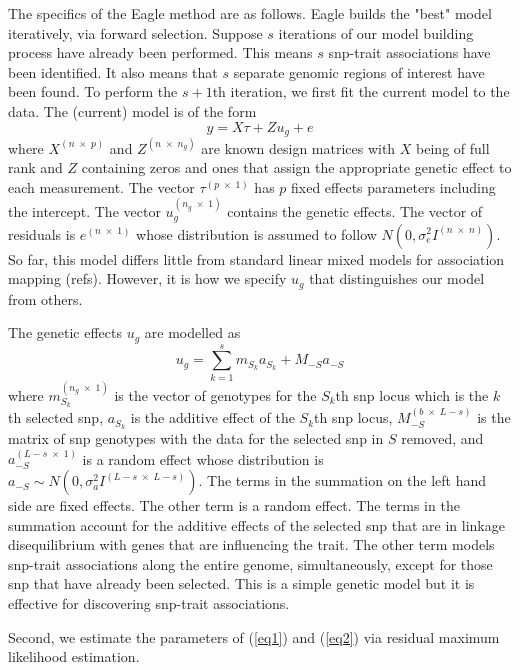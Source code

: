 \documentclass{nature}
\begin{document}
The specifics of the Eagle method are as follows. 
Eagle builds the "best" model iteratively, via forward selection. 
Suppose $s$ iterations of our model building process have already been performed. This means $s$ snp-trait 
associations have been identified.  It also means that $s$ separate genomic regions of interest have been found.  
To perform the $s+1$th  iteration, we first fit the current model to the data. 
The (current) model is of the form 
\begin{equation}
\label{eq1}
y = X \tau + Z u_g + e
\end{equation}
where 
$X^{(n \; \times \; p)}$ and $Z^{( n \; \times \; n_g)}$ are known design matrices with $X$ being of full rank and $Z$ 
containing zeros and ones that assign the appropriate genetic effect to each measurement. 
The vector 
$\tau^{(p \; \times \; 1)}$ has $p$ fixed effects parameters including the intercept. The vector 
$u_g^{(n_g \; \times \; 1)}$ contains the 
genetic effects. The vector of residuals is 
$e^{(n \; \times \;1)}$ whose distribution is assumed to follow $N(0, \sigma^2_e I^{(n \; \times \; n)})$. 
So far,  this model differs little from standard linear mixed models for association mapping (refs). 
However, 
it is how we specify $u_g$ that distinguishes our model from others. 

The genetic effects $u_g$ are modelled as 
\begin{equation}
\label{eq2}
u_g = \sum_{k=1}^s  m_{S_k} a_{S_k} + M_{-S} a_{-S}
\end{equation}
where $m_{S_k}^{(n_g \; \times \; 1)}$ is the vector of genotypes for the $S_k$th snp locus which is the $k$th selected snp, 
$a_{S_k}$ is the additive effect of the $S_k$th snp locus, $M_{-S}^{(b \; \times \; L-s)}$ is the matrix of  snp genotypes 
with the data for the selected snp in $S$ removed,  and $a_{-S}^{(L-s \; \times  \; 1)}$ is a random effect whose distribution is 
$a_{-S} \sim N(0, \sigma_a^2 I^{(L-s \; \times \;  L-s)})$. 
The terms in the summation on the left hand side are fixed effects.  The other term is a random effect.  The terms 
in the summation account 
for the additive effects of the selected snp that are in linkage disequilibrium with genes that are influencing the trait. The other term models 
snp-trait associations along the entire genome, simultaneously, except for those snp that have already been selected. 
This is a simple genetic model but it 
is effective for discovering snp-trait associations. 


Second, we estimate the parameters of (\ref{eq1}) and (\ref{eq2}) via residual maximum likelihood estimation. 
\end{document}
